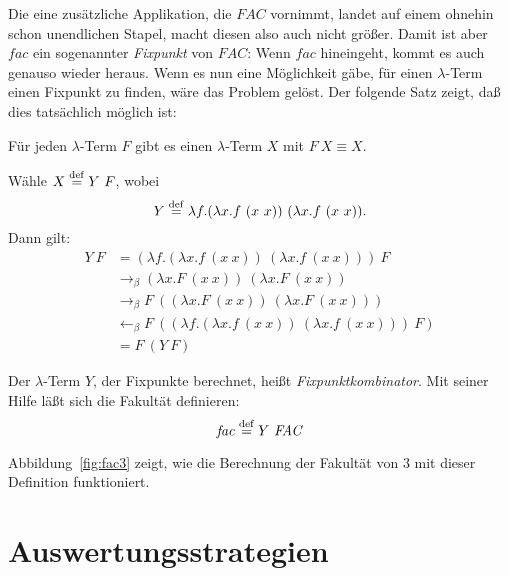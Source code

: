 Die eine zusätzliche Applikation, die $\mathit{FAC}$ vornimmt, landet
auf einem ohnehin schon unendlichen Stapel,
macht diesen also auch nicht größer.  Damit ist aber $\mathit{fac}$ ein sogenannter
\textit{Fixpunkt} von $\mathit{FAC}$:  Wenn $\mathit{fac}$
hineingeht, kommt es auch genauso wieder heraus.  Wenn es nun eine
Möglichkeit gäbe, für einen $\lambda$-Term einen Fixpunkt zu finden,
wäre das Problem gelöst.  Der folgende Satz zeigt, daß dies tatsächlich
möglich ist:
%
\begin{satz}[Fixpunktsatz]
  \label{satz:fixpunkt}
  Für jeden $\lambda$-Term $F$ gibt es einen $\lambda$-Term $X$ mit
  $F~X\equiv X$.
\end{satz}
\begin{beweis}
  Wähle $X \stackrel{\rm def}{=}{} Y~F$, wobei
  \begin{displaymath}
    Y \stackrel{\rm def}{=}{} \lambda f.(\lambda x.f~(x~x))~(\lambda x.f~(x~x)).
  \end{displaymath}
  Dann gilt:
  \begin{displaymath}
    \begin{split}
      Y~F & = (\lambda f.(\lambda x.f~(x~x))~(\lambda x.f~(x~x)))~F
      \\ & \rightarrow_\beta
      (\lambda x.F~(x~x))~(\lambda x.F~(x~x))
      \\ & \rightarrow_\beta
      F~((\lambda x.F~(x~x))~(\lambda x.F~(x~x)))
      \\ & \leftarrow_\beta
      F~((\lambda f.(\lambda x.f~(x~x))~(\lambda x.f~(x~x)))~F)
      \\ & =
      F~(Y~F)
    \end{split}
  \end{displaymath}
\end{beweis}
%
Der $\lambda$-Term $Y$, der Fixpunkte
berechnet, heißt
\textit{Fixpunktkombinator}.  Mit seiner Hilfe läßt sich
die Fakultät definieren:
%
\begin{displaymath}
  \mathit{fac} \stackrel{\rm def}{=}{} Y~\mathit{FAC}
\end{displaymath}
%

Abbildung~\ref{fig:fac3} zeigt, wie die Berechnung der Fakultät von
$3$ mit dieser Definition funktioniert.

\section{Auswertungsstrategien}
\label{sec:lambda-evaluation-strategies}

